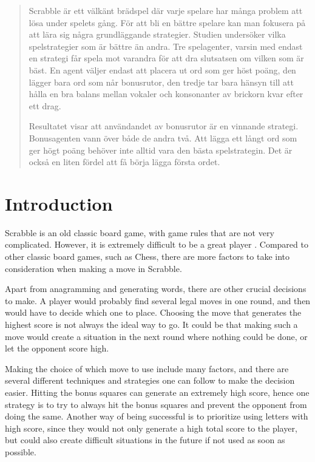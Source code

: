 \documentclass[a4paper, 12pt]{report}
\begin{document}
\begin{abstract}
Scrabble är ett välkänt brädspel där varje spelare har många problem att lösa under spelets gång. För att bli en bättre spelare kan man fokusera på att lära sig några grundläggande strategier. Studien undersöker vilka spelstrategier som är bättre än andra. Tre spelagenter, varsin med endast en strategi får spela mot varandra för att dra slutsatsen om vilken som är bäst. En agent väljer endast att placera ut ord som ger höst poäng, den lägger bara ord som når bonusrutor, den tredje tar bara hänsyn till att hålla en bra balans mellan vokaler och konsonanter av brickorn kvar efter ett drag.

Resultatet visar att användandet av bonusrutor är en vinnande strategi. Bonusagenten vann över både de andra två. Att lägga ett långt ord som ger högt poäng behöver inte alltid vara den bästa spelstrategin. Det är också en liten fördel att få börja lägga första ordet. 
\end{abstract}
\tableofcontents





\chapter{Introduction}
Scrabble is an old classic board game, with game rules that are not very complicated. However, it is extremely difficult to be a great player \cite{perfectgame}. Compared to other classic board games, such as Chess, there are more factors to take into consideration when making a move in Scrabble. 

Apart from anagramming and generating words, there are other crucial decisions to make. A player would probably find several legal moves in one round, and then would have to decide which one to place. Choosing the move that generates the highest score is not always the ideal way to go. It could be that making such a move would create a situation in the next round where nothing could be done, or let the opponent score high.

Making the choice of which move to use include many factors, and there are several different techniques and strategies one can follow to make the decision easier. Hitting the bonus squares can generate an extremely high score, hence one strategy is to try to always hit the bonus squares and prevent the opponent from doing the same. Another way of being successful is to prioritize using letters with high score, since they would not only generate a high total score to the player, but could also create difficult situations in the future if not used as soon as possible.
\end{document}
